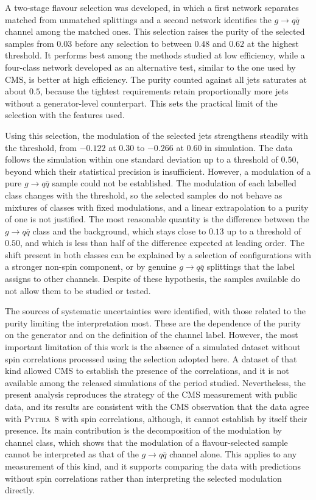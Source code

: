 A two-stage flavour selection was developed, in which a first network separates
matched from unmatched splittings and a second network identifies the
$g \to q\bar{q}$ channel among the matched ones. This selection raises the purity 
of the selected samples from $0.03$ before any selection to between $0.48$ and $0.62$ at
the highest threshold. It performs best among the methods studied at low
efficiency, while a four-class network developed as an alternative test, similar to the one used by CMS, is better
at high efficiency. The purity counted against all jets saturates at about $0.5$,
because the tightest requirements retain proportionally more jets without a
generator-level counterpart. This sets the practical limit of the selection with
the features used.

Using this selection, the modulation of the selected jets strengthens steadily with
the threshold, from $-0.122$ at $0.30$ to $-0.266$ at $0.60$ in simulation. The data 
follows the simulation within one standard deviation up to a threshold of
$0.50$, beyond which their statistical precision is insufficient. However,
a modulation of a pure $g \to q\bar{q}$ sample could not be established. The modulation of each
labelled class changes with the threshold, so the selected samples do not behave
as mixtures of classes with fixed modulations,
and a linear extrapolation to a purity of one is not justified. The most reasonable
quantity is the difference between the $g \to q\bar{q}$ class and the background,
which stays close to $0.13$ up to a threshold of $0.50$, and which is less than 
half of the difference expected at leading order. The shift present in both classes can be explained
by a selection of configurations with a stronger non-spin
component, or by genuine $g \to q\bar{q}$ splittings that the label assigns to
other channels. Despite of these hypothesis, the samples available do not allow 
them to be studied or tested.

The sources of systematic uncertainties were identified, with those related to the purity 
limiting the interpretation most. These are the dependence of
the purity on the generator and on the definition of the channel label.
However, the most important limitation of this work is the absence of a simulated dataset 
without spin correlations processed using the selection adopted here. A dataset of that 
kind allowed CMS to establish the presence of the correlations, and it is not
available among the released simulations of the period studied. Nevertheless, the present
analysis reproduces the strategy of the CMS measurement with public data,
and its results are consistent with the CMS observation that the data agree with
\textsc{Pythia}~8 with spin correlations, although, it cannot establish by itself 
their presence. Its main contribution is the decomposition of the modulation by channel
class, which shows that the modulation of a flavour-selected sample cannot be
interpreted as that of the $g \to q\bar{q}$ channel alone. This applies to any
measurement of this kind, and it supports comparing the data with predictions
without spin correlations rather than interpreting the selected modulation
directly.

